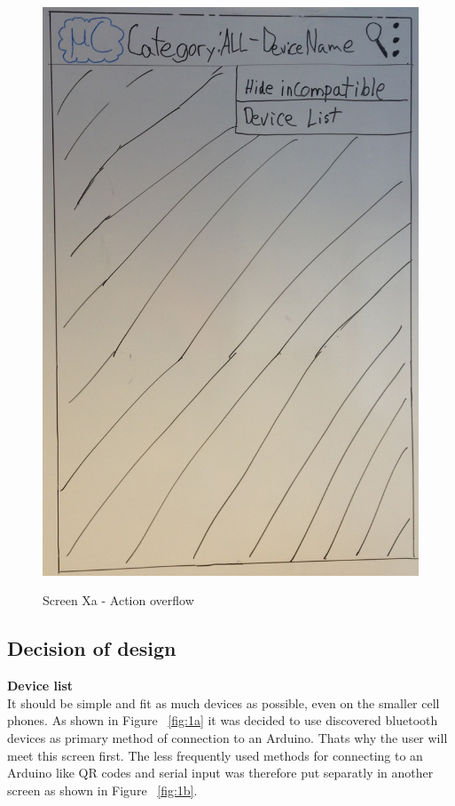 \begin{figure}[H]
\centering
\includegraphics[scale=0.2]{images/Design_guide/ScreenXa.png}
\label{fig:Xa}
\caption{Screen Xa - Action overflow}
\end{figure}

	\subsection{Decision of design}
	\textbf{Device list}\\
	It should be simple and fit as much devices as possible, even on the smaller cell phones. As shown in Figure ~\ref{fig:1a} it was decided to use discovered bluetooth devices as primary method of connection to an Arduino. Thats why the user will meet this screen first. The less frequently used methods for connecting to an Arduino like QR codes and serial input was therefore put separatly in another screen as shown in Figure ~\ref{fig:1b}. 

